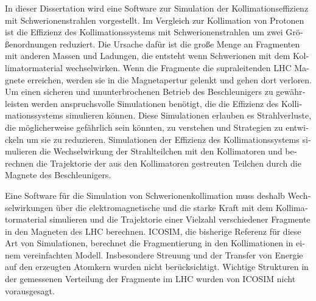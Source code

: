 \begin{otherlanguage}{german}
In dieser Dissertation wird eine Software zur Simulation der Kollimationseffizienz mit \mbox{Schwerionenstrahlen} vorgestellt. Im Vergleich zur Kollimation von Protonen ist die Effizienz des Kollimationssystems mit Schwerionenstrahlen um zwei Gr\"{o}\ss enordnungen reduziert. Die Ursache daf\"{u}r ist die gro\ss e Menge an Fragmenten mit anderen Massen und Ladungen, die entsteht wenn Schwerionen mit dem Kollimatormaterial wechselwirken.  Wenn die Fragmente die supraleitenden LHC Magnete erreichen, werden sie in die Magnetapertur gelenkt und gehen dort verloren. Um einen sicheren und ununterbrochenen Betrieb des Beschleunigers zu gew\"{a}hrleisten werden anspruchsvolle Simulationen ben\"{o}tigt, die die Effizienz des Kollimationssystems simulieren k\"{o}nnen. Diese Simulationen erlauben es  Strahlverluste, die m\"{o}glicherweise gef\"{a}hrlich sein k\"{o}nnten, zu verstehen und Strategien zu entwickeln um sie zu reduzieren. Simulationen der Effizienz des Kollimationssystems simulieren die Wechselwirkung der Strahlteilchen mit den Kollimatoren und berechnen die Trajektorie der aus den Kollimatoren gestreuten Teilchen durch die Magnete des Beschleunigers. 




\vspace{0.2cm}
%
\vspace{0.2cm}

Eine Software f\"{u}r die Simulation von Schwerionenkollimation muss deshalb Wechselwirkungen \"{u}ber die elektromagnetische und die starke Kraft mit dem Kollimatormaterial simulieren und die Trajektorie einer Vielzahl verschiedener Fragmente in den Magneten des LHC berechnen. ICOSIM, die bisherige Referenz f\"{u}r diese Art von Simulationen, berechnet die Fragmentierung in den Kollimationen in einem vereinfachten Modell. Insbesondere Streuung und der Transfer von Energie auf den erzeugten Atomkern wurden nicht ber\"{u}cksichtigt. Wichtige Strukturen in der gemessenen Verteilung der Fragmente im LHC wurden von ICOSIM nicht vorausgesagt.
\vspace{0.2cm}



\end{otherlanguage}
